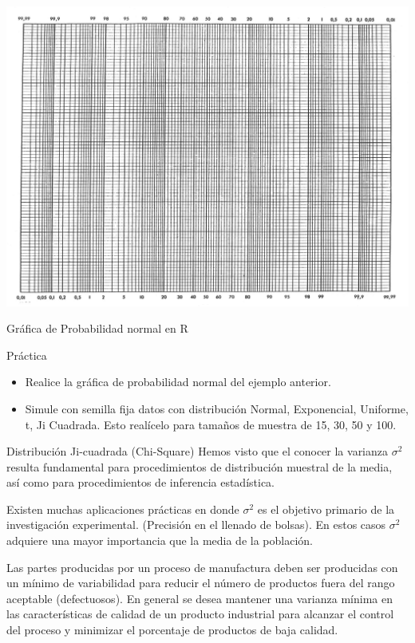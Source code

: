\documentclass[
  10pt,
  ignorenonframetext,
]{beamer}
\begin{document}
\begin{frame}{}
\protect\hypertarget{section-45}{}
\includegraphics{figuras/probpaperLandscape.png}
\end{frame}

\begin{frame}{Gráfica de Probabilidad normal en R}
\protect\hypertarget{gruxe1fica-de-probabilidad-normal-en-r}{}
\begin{block}{Práctica}
\protect\hypertarget{pruxe1ctica}{}
\begin{itemize}
\item
  Realice la gráfica de probabilidad normal del ejemplo anterior.
\item
  Simule con semilla fija datos con distribución Normal, Exponencial,
  Uniforme, t, Ji Cuadrada. Esto realícelo para tamaños de muestra de
  15, 30, 50 y 100.
\end{itemize}
\end{block}
\end{frame}

\begin{frame}{Distribución Ji-cuadrada (Chi-Square)}
\protect\hypertarget{distribuciuxf3n-ji-cuadrada-chi-square}{}
Hemos visto que el conocer la varianza \(\sigma^2\) resulta fundamental
para procedimientos de distribución muestral de la media, así como para
procedimientos de inferencia estadística.

Existen muchas aplicaciones prácticas en donde \(\sigma^2\) es el
objetivo primario de la investigación experimental. (Precisión en el
llenado de bolsas). En estos casos \(\sigma^2\) adquiere una mayor
importancia que la media de la población.

Las partes producidas por un proceso de manufactura deben ser producidas
con un mínimo de variabilidad para reducir el número de productos fuera
del rango aceptable (defectuosos). En general se desea mantener una
varianza mínima en las características de calidad de un producto
industrial para alcanzar el control del proceso y minimizar el
porcentaje de productos de baja calidad.
\end{frame}
\end{document}
